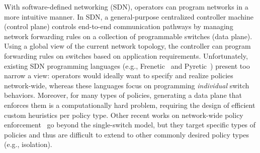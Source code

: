 

With software-defined networking (SDN),
operators can program networks in a more intuitive manner. In SDN, a
general-purpose centralized controller machine (control plane)
controls end-to-end communication pathways by managing network
forwarding rules on a collection of programmable switches (data
plane). Using a global view of the current network topology, the
controller can program forwarding rules on switches based on
application requirements.
Unfortunately, existing SDN programming languages (e.g.,
Frenetic~\cite{frenetic} and Pyretic~\cite{pyretic}) present too
narrow a view: operators would ideally want to specify and realize
policies network-wide, whereas these languages focus on
programming {\em individual} switch behaviors.  Moreover, for many
types of policies, generating a data plane that enforces them is a
computationally hard problem, requiring the design of efficient custom
heuristics  per policy type. Other recent works on
network-wide policy enforcement~\cite{merlin,simple} go beyond the
single-switch model, but they target specific types of policies and
thus are difficult to extend to other commonly desired policy types
(e.g., isolation).







